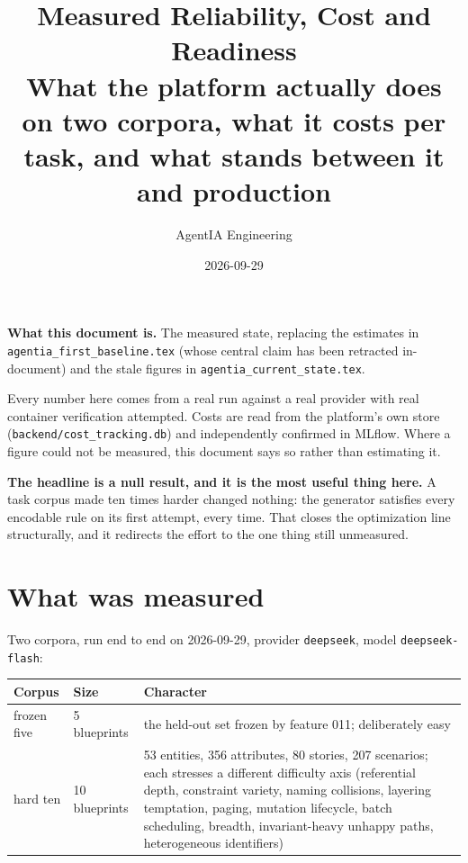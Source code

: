 \documentclass[11pt,a4paper]{article}
\title{\vspace{-1.4cm}\textbf{Measured Reliability, Cost and Readiness}\\[0.25cm]
\large What the platform actually does on two corpora, what it costs per task, and
what stands between it and production}
\author{AgentIA Engineering}
\date{2026-09-29}
\begin{document}
\maketitle
\thispagestyle{fancy}

\begin{notebox}
\textbf{What this document is.} The measured state, replacing the estimates in
\texttt{agentia\_first\_baseline.tex} (whose central claim has been retracted
in-document) and the stale figures in \texttt{agentia\_current\_state.tex}.

Every number here comes from a real run against a real provider with real container
verification attempted. Costs are read from the platform's own store
(\texttt{backend/cost\_tracking.db}) and independently confirmed in MLflow. Where a
figure could not be measured, this document says so rather than estimating it.

\textbf{The headline is a null result, and it is the most useful thing here.} A task
corpus made ten times harder changed nothing: the generator satisfies every
encodable rule on its first attempt, every time. That closes the optimization line
structurally, and it redirects the effort to the one thing still unmeasured.
\end{notebox}

\tableofcontents
\vspace{0.5cm}

\section{What was measured}

Two corpora, run end to end on 2026-09-29, provider \texttt{deepseek}, model
\texttt{deepseek-flash}:

\begin{center}
\begin{tabular}{@{}p{}p{}p{}@{}}
\toprule
\textbf{Corpus} & \textbf{Size} & \textbf{Character} \\
\midrule
frozen five & 5 blueprints & the held-out set frozen by feature 011; deliberately
easy \\
hard ten & 10 blueprints & 53 entities, 356 attributes, 80 stories, 207 scenarios;
each stresses a different difficulty axis (referential depth, constraint variety,
naming collisions, layering temptation, paging, mutation lifecycle, batch
scheduling, breadth, invariant-heavy unhappy paths, heterogeneous identifiers) \\
\bottomrule
\end{tabular}
\end{center}
\end{document}
